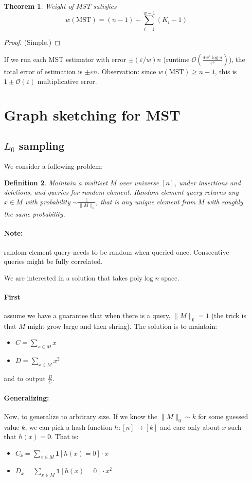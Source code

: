 \documentclass[11pt]{article}
\newtheorem{theorem}{Theorem}
\newtheorem{definition}[theorem]{Definition}
\newcommand{\bigo}{\mathcal{O}}
\begin{document}
\begin{theorem}
Weight of MST satisfies
$$w(\text{MST}) = (n-1) + \sum_{i=1}^{w-1} (K_i - 1)$$
\end{theorem}
\begin{proof} (Simple.)
\end{proof}


If we run each MST estimator with error $\pm (\varepsilon/w)n$ (runtime $\bigo(\frac{d w^4 \log n}{\varepsilon^3})$), the total error of estimation is $\pm \varepsilon n$. Observation: since $w(\text{MST}) \ge n-1$, this is $1\pm \bigo(\varepsilon)$ multiplicative error.


\section{Graph sketching for MST}
\subsection{$L_0$ sampling}
We consider a following problem:
\begin{definition}
Maintain a multiset $M$ over universe $[n]$, under insertions and deletions, and queries for random element. Random element query returns any $x \in M$ with probability $\sim \frac{1}{\|M\|_0}$, that is any unique element from $M$ with roughly the same probability.
\end{definition}

\paragraph{Note:} random element query needs to be random when queried once. Consecutive queries might be fully correlated.

We are interested in a solution that takes $\text{poly} \log n$ space.

\paragraph{First} assume we have a guarantee that when there is a query, $\|M\|_0 = 1$ (the trick is that $M$ might grow large and then shring). The solution is to maintain:
\begin{itemize}
\item $C = \sum_{x \in M} x$
\item $D = \sum_{x \in M} x^2$
\end{itemize}
and to output $\frac{D}{C}$.

\paragraph{Generalizing:} Now, to generalize to arbitrary size. If we know the $\|M\|_0 \sim k$ for some guessed value $k$, we can pick a hash function $h : [n] \to [k]$ and care only about $x$ such that $h(x) = 0$. That is:
\begin{itemize}
\item $C_k = \sum_{x \in M} \mathbf{1}[h(x) = 0] \cdot x$
\item $D_k = \sum_{x \in M} \mathbf{1}[h(x) = 0] \cdot x^2$
\end{itemize}
\end{document}
